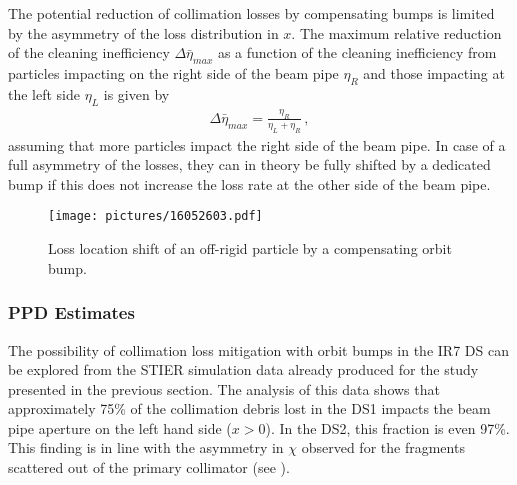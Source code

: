 The potential reduction of collimation losses by compensating bumps is limited by the asymmetry of the loss distribution in $x$. The maximum  relative reduction of the cleaning inefficiency $\Delta \bar{\eta}_{max}$ as a function of the cleaning inefficiency from particles impacting on the right side of the beam pipe $\eta_{R}$ and those impacting at the left side $\eta_L$ is given by
\begin{align}
\Delta \bar{\eta}_{max} = \frac{\eta_R}{\eta_L + \eta_R} \, ,
\end{align}
assuming that more particles impact the right side of the beam pipe.  In case of a full asymmetry of the losses, they can in theory be fully shifted by a dedicated bump if this does not increase the loss rate at the other side of the beam pipe.

\begin{figure}[t]  
    \centering
    \texttt{[image: pictures/16052603.pdf]}
    \caption{Loss location shift of an off-rigid particle by a compensating orbit bump.}  
    \label{pic:16052602}
\end{figure}


\subsubsection{PPD Estimates}

The possibility of collimation loss mitigation with orbit bumps in the IR7 DS can be explored from the STIER simulation data already produced for the study presented in the previous section. The analysis of this data shows that approximately 75\% of the collimation debris lost in the DS1 impacts the beam pipe aperture on the left hand side ($x>0$). In the DS2, this fraction is even 97\%. This finding is in line with the asymmetry in $\chi$ observed for the fragments scattered out of the primary collimator (see ).




